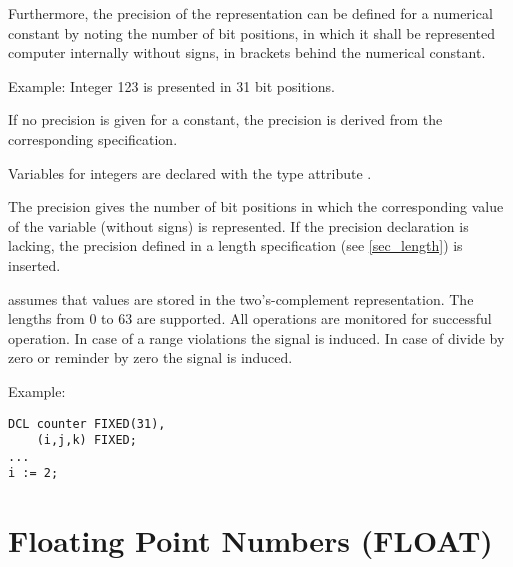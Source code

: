 Furthermore, the precision of the representation can be defined for a
numerical constant by noting the number of bit positions, in which it
shall be represented computer internally without signs, in brackets behind
the numerical constant.

Example:  \x Integer 123 is presented in 31 bit positions.

If no precision is given for a constant,
the precision is derived from the %
corresponding  specification.

Variables for integers are declared with the type attribute .
\begin{grammarframe}


\end{grammarframe}

The precision gives the number of bit positions in which the
corresponding value of the variable (without signs) is represented. If
the precision declaration is lacking, the precision defined in a length
specification (see \ref{sec_length}) is inserted. 

\OpenPEARL{} assumes that  values are stored in 
the two's-complement representation.
The lengths from 0 to 63 are supported.
All operations are monitored for successful operation.
In case of a range violations the signal  is induced.
In case of divide by zero or reminder by zero the signal 
is induced.

Example:

\begin{lstlisting}
DCL counter FIXED(31),
    (i,j,k) FIXED;
...
i := 2;
\end{lstlisting}

\section{Floating Point Numbers (FLOAT)}  %
\label{sec_type_float}

